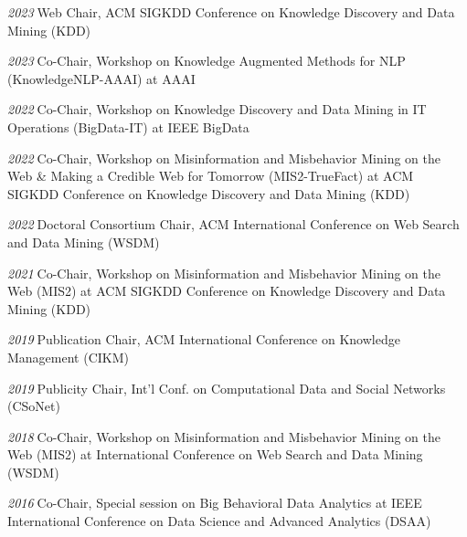 \documentclass[10pt]{article}
\newenvironment{myindentpar}[1]%
{\begin{list}{}%
         {\setlength{\leftmargin}{#1}}%
         \item[]%
}
{\end{list}}
\newcounter{list}
\begin{document}
\begin{myindentpar}{0.75cm}
\hspace{-0.75cm}{\bf Organizing Committee}

{\small

\hspace{-0.75cm}\textit{2023}\textcolor{white}{.}Web Chair, ACM SIGKDD Conference on Knowledge Discovery and Data Mining (KDD)

\hspace{-0.75cm}\textit{2023}\textcolor{white}{.}Co-Chair, Workshop on Knowledge Augmented Methods for NLP (KnowledgeNLP-AAAI) at AAAI

\hspace{-0.75cm}\textit{2022}\textcolor{white}{.}Co-Chair, Workshop on Knowledge Discovery and Data Mining in IT Operations (BigData-IT) at IEEE BigData

\hspace{-0.75cm}\textit{2022}\textcolor{white}{.}Co-Chair, Workshop on Misinformation and Misbehavior Mining on the Web \& Making a Credible Web for Tomorrow (MIS2-TrueFact) at ACM SIGKDD Conference on Knowledge Discovery and Data Mining (KDD)

\hspace{-0.75cm}\textit{2022}\textcolor{white}{.}Doctoral Consortium Chair, ACM International Conference on Web Search and Data Mining (WSDM)

\hspace{-0.75cm}\textit{2021}\textcolor{white}{.}Co-Chair, Workshop on Misinformation and Misbehavior Mining on the Web (MIS2) at ACM SIGKDD Conference on Knowledge Discovery and Data Mining (KDD)

\hspace{-0.75cm}\textit{2019}\textcolor{white}{.}Publication Chair, ACM International Conference on Knowledge Management (CIKM)

\hspace{-0.75cm}\textit{2019}\textcolor{white}{.}Publicity Chair, Int'l Conf. on Computational Data and Social Networks (CSoNet)

\hspace{-0.75cm}\textit{2018}\textcolor{white}{.}Co-Chair, Workshop on Misinformation and Misbehavior Mining on the Web (MIS2) at International Conference on Web Search and Data Mining (WSDM)

\hspace{-0.75cm}\textit{2016}\textcolor{white}{.}Co-Chair, Special session on Big Behavioral Data Analytics at IEEE International Conference on Data Science and Advanced Analytics (DSAA)

}
\end{myindentpar}
\end{document}
